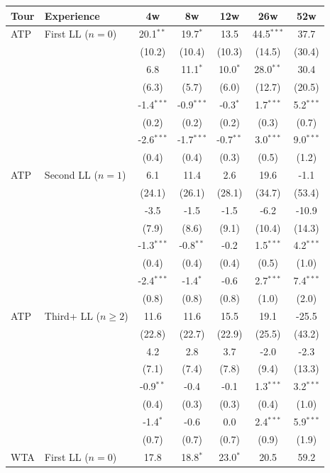 \begin{tabular}{l l*{5}{c}}
\toprule
Tour & Experience & 4w & 8w & 12w & 26w & 52w \\
\midrule
ATP & First LL ($n=0$) & 20.1$^{**}$ & 19.7$^{*}$ & 13.5 & 44.5$^{***}$ & 37.7 \\
  &  & (10.2) & (10.4) & (10.3) & (14.5) & (30.4) \\
  &  & 6.8 & 11.1$^{*}$ & 10.0$^{*}$ & 28.0$^{**}$ & 30.4 \\
  &  & (6.3) & (5.7) & (6.0) & (12.7) & (20.5) \\
  &  & -1.4$^{***}$ & -0.9$^{***}$ & -0.3$^{*}$ & 1.7$^{***}$ & 5.2$^{***}$ \\
  &  & (0.2) & (0.2) & (0.2) & (0.3) & (0.7) \\
  &  & -2.6$^{***}$ & -1.7$^{***}$ & -0.7$^{**}$ & 3.0$^{***}$ & 9.0$^{***}$ \\
  &  & (0.4) & (0.4) & (0.3) & (0.5) & (1.2) \\
[0.3em]
ATP & Second LL ($n=1$) & 6.1 & 11.4 & 2.6 & 19.6 & -1.1 \\
  &  & (24.1) & (26.1) & (28.1) & (34.7) & (53.4) \\
  &  & -3.5 & -1.5 & -1.5 & -6.2 & -10.9 \\
  &  & (7.9) & (8.6) & (9.1) & (10.4) & (14.3) \\
  &  & -1.3$^{***}$ & -0.8$^{**}$ & -0.2 & 1.5$^{***}$ & 4.2$^{***}$ \\
  &  & (0.4) & (0.4) & (0.4) & (0.5) & (1.0) \\
  &  & -2.4$^{***}$ & -1.4$^{*}$ & -0.6 & 2.7$^{***}$ & 7.4$^{***}$ \\
  &  & (0.8) & (0.8) & (0.8) & (1.0) & (2.0) \\
[0.3em]
ATP & Third+ LL ($n \geq 2$) & 11.6 & 11.6 & 15.5 & 19.1 & -25.5 \\
  &  & (22.8) & (22.7) & (22.9) & (25.5) & (43.2) \\
  &  & 4.2 & 2.8 & 3.7 & -2.0 & -2.3 \\
  &  & (7.1) & (7.4) & (7.8) & (9.4) & (13.3) \\
  &  & -0.9$^{**}$ & -0.4 & -0.1 & 1.3$^{***}$ & 3.2$^{***}$ \\
  &  & (0.4) & (0.3) & (0.3) & (0.4) & (1.0) \\
  &  & -1.4$^{*}$ & -0.6 & 0.0 & 2.4$^{***}$ & 5.9$^{***}$ \\
  &  & (0.7) & (0.7) & (0.7) & (0.9) & (1.9) \\
[0.3em]
\midrule
WTA & First LL ($n=0$) & 17.8 & 18.8$^{*}$ & 23.0$^{*}$ & 20.5 & 59.2 \\

\end{tabular}
